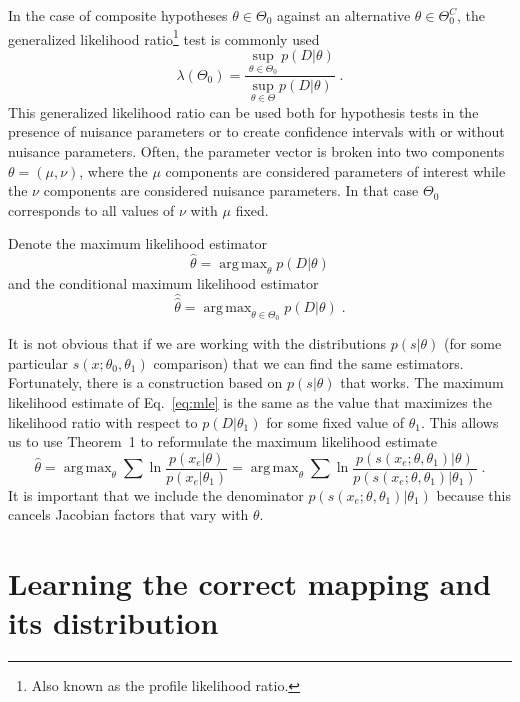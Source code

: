 \documentclass[12pt]{article}
\DeclareMathOperator*{\argmax}{arg\,max}
\numberwithin{equation}{section}
\theoremstyle{plain}
\begin{document}
In the case of composite hypotheses $\theta \in \Theta_0$ against an alternative $\theta \in \Theta_0^C$, the generalized likelihood ratio\footnote{Also known as the profile likelihood ratio.} test is commonly used
\begin{equation}
\lambda(\Theta_0) =  \frac{ \sup_{\theta \in \Theta_0} p(D | \theta)}{ \sup_{\theta \in \Theta} p(D | \theta)} \; .
\end{equation}
This generalized likelihood ratio can be used both for hypothesis tests in the presence of nuisance parameters or to create confidence intervals with or without nuisance parameters.  Often, the parameter vector is broken into two components $\theta=(\mu,\nu)$, where the $\mu$ components are considered parameters of interest while the $\nu$ components are considered nuisance parameters. In that case $\Theta_0$ corresponds to all values of $\nu$ with $\mu$ fixed.

Denote the maximum likelihood estimator
\begin{equation}\label{eq:mle}
\hat{\theta} = \argmax_\theta  p(D | \theta)
\end{equation}
and the conditional maximum likelihood estimator
\begin{equation}\label{eq:cmle}
\hat{\hat{\theta}} = \argmax_{\theta \in \Theta_0}  p(D | \theta) \; .
\end{equation}

It is not obvious that if we are working with the distributions $p(s|\theta)$ (for some particular $s(x; \theta_0, \theta_1)$ comparison) that we can find the same estimators.
Fortunately, there is a construction based on $p(s|\theta)$ that works. The maximum likelihood estimate of Eq.~\ref{eq:mle} is the same as the value that maximizes the likelihood ratio with respect to $p(D|\theta_1)$ for some fixed value of $\theta_1$. This allows us to use Theorem~1 to reformulate the maximum likelihood estimate
\begin{equation}\label{eq:mle_withs}
\hat{\theta} = %
\argmax_\theta  \sum \ln \frac{p(x_e | \theta)}{p(x_e|\theta_1)} = \argmax_\theta  \sum \ln \frac{p(s(x_e; \theta, \theta_1) | \theta)}{p(s(x_e; \theta, \theta_1) |\theta_1)} \; .
\end{equation}
It is important that we include the denominator $p(s(x_e; \theta, \theta_1) |\theta_1)$ because this cancels Jacobian factors that vary with $\theta$.

\section{Learning the correct mapping and its distribution}\label{S:classifier}
\end{document}
